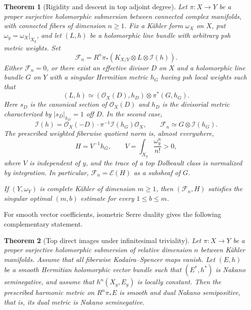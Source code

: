 \documentclass[11pt,reqno]{amsart}
\numberwithin{equation}{section}
\newtheorem{theorem}{Theorem}[section]
\theoremstyle{definition}
\theoremstyle{remark}
\begin{document}
\begin{theorem}[Rigidity and descent in top adjoint degree]
\label{thm:singular-top-rigidity}
Let $\pi:X\to Y$ be a proper surjective holomorphic submersion
between connected complex manifolds, with connected fibers of dimension
$n\ge1$.  Fix a K\"ahler form $\omega_X$ on $X$, put
$\omega_y=\omega_X|_{X_y}$, and let $(L,h)$ be a holomorphic line
bundle with arbitrary psh metric weights.  Set
\[
 \mathcal F_n=R^n\pi_*
   (K_{X/Y}\otimes L\otimes\mathcal I(h)).
\]
Either $\mathcal F_n=0$, or there exist an effective
divisor $D$ on $X$ and a holomorphic line bundle $G$ on $Y$ with a singular
Hermitian metric $h_G$ having psh local weights such that
\begin{equation}\label{eq:top-singular-factorization}
 (L,h)\simeq
 (\mathcal O_X(D),h_D)\otimes\pi^*(G,h_G).
\end{equation}
Here $s_D$ is the canonical section of $\mathcal O_X(D)$ and $h_D$
is the divisorial metric characterized by $|s_D|_{h_D}=1$ off $D$.
In the second case,
\begin{equation}\label{eq:top-singular-sheaf}
 \mathcal I(h)=\mathcal O_X(-D)\cdot
       \pi^{-1}\mathcal I(h_G)\mathcal O_X,
 \qquad
 \mathcal F_n\simeq G\otimes\mathcal I(h_G).
\end{equation}
The prescribed weighted fiberwise quotient norm is, almost everywhere,
\begin{equation}\label{eq:top-singular-metric}
 H=V^{-1}h_G,
 \qquad
 V=\int_{X_y}\frac{\omega_y^n}{n!}>0,
\end{equation}
where $V$ is independent of $y$, and the trace of a top Dolbeault class
is normalized by integration. In particular,
$\mathcal F_n=\mathscr E(H)$ as a subsheaf of $G$.

If $(Y,\omega_Y)$ is complete K\"ahler of dimension $m\geq1$, then
$(\mathcal F_n,H)$ satisfies the singular optimal $(m,b)$ estimate for
every $1\leq b\leq m$.
\end{theorem}

For smooth vector coefficients, isometric Serre duality gives the
following complementary statement.

\begin{theorem}[Top direct images under infinitesimal triviality]
\label{thm:top-dual}
Let $\pi:X\to Y$ be a proper surjective holomorphic submersion of
relative dimension $n$ between K\"ahler manifolds.  Assume that all
fiberwise Kodaira--Spencer maps vanish.  Let $(E,h)$ be a smooth
Hermitian holomorphic vector bundle such that $(E^*,h^*)$ is Nakano
seminegative, and assume that $h^n(X_y,E_y)$ is locally constant.
Then the prescribed harmonic metric on $R^n\pi_*E$ is smooth and
dual Nakano semipositive, that is, its dual metric is Nakano
seminegative.
\end{theorem}
\end{document}
